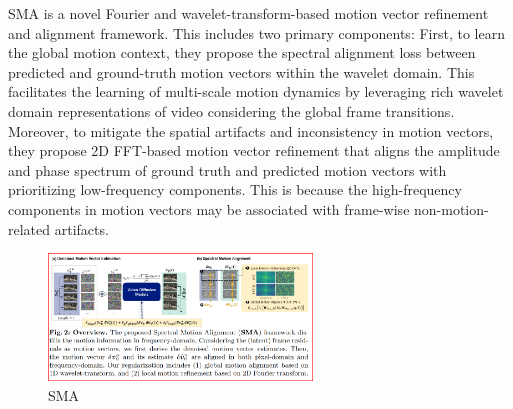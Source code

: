 \documentclass[lettersize,journal]{IEEEtran}
\begin{document}
SMA is a novel Fourier and wavelet-transform-based motion vector refinement
and alignment framework. This includes two primary components: First, to learn
the global motion context, they propose the spectral alignment loss between predicted and ground-truth motion vectors within the wavelet domain. This facilitates the learning of multi-scale motion dynamics by leveraging rich wavelet domain representations of video considering the global frame transitions. Moreover, to mitigate the spatial artifacts and inconsistency in motion vectors, they propose 2D FFT-based motion vector refinement that aligns the amplitude and phase spectrum of ground truth and predicted motion vectors with prioritizing low-frequency components. This is because the high-frequency components in motion vectors may be associated with frame-wise non-motion-related artifacts.
\begin{figure}[h!]
    \centering
    \includegraphics[width=7cm]{Image/SMA.png}
    \caption{SMA}
    \label{fig-sample}
\end{figure}
\end{document}
